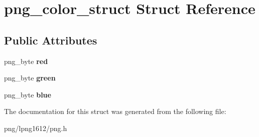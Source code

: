 \hypertarget{structpng__color__struct}{\section{png\+\_\+color\+\_\+struct Struct Reference}
\label{structpng__color__struct}
}
\subsection*{Public Attributes}
\begin{DoxyCompactItemize}
\item 
\hypertarget{structpng__color__struct_ad39dc2d7cb82e3670a3ad397bb4083cb}{png\+\_\+byte {\bfseries red}}\label{structpng__color__struct_ad39dc2d7cb82e3670a3ad397bb4083cb}

\item 
\hypertarget{structpng__color__struct_ada9b5a911b185eaf7c6b87934e9f11ce}{png\+\_\+byte {\bfseries green}}\label{structpng__color__struct_ada9b5a911b185eaf7c6b87934e9f11ce}

\item 
\hypertarget{structpng__color__struct_a528e625b2778e787dc182e5df1164bbc}{png\+\_\+byte {\bfseries blue}}\label{structpng__color__struct_a528e625b2778e787dc182e5df1164bbc}

\end{DoxyCompactItemize}


The documentation for this struct was generated from the following file\+:\begin{DoxyCompactItemize}
\item 
png/lpng1612/png.\+h\end{DoxyCompactItemize}
